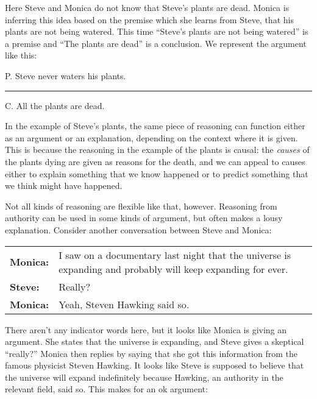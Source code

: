 Here Steve and Monica do not know that Steve's plants are dead. Monica is inferring this idea based on the premise which she learns from Steve, that his plants are not being watered. This time ``Steve's plants are not being watered'' is a premise and ``The plants are dead'' is a conclusion. We represent the argument like this:

\begin{earg}
\item[P.] Steve never waters his plants. 
\vspace{-.5em}
\item [] \rule{0.3\linewidth}{.5pt} 
\item[C.] All the plants are dead. 
\end{earg}

In the example of Steve's plants, the same piece of reasoning can function either as an argument or an explanation, depending on the context where it is given. This is because the reasoning in the example of the plants is causal: the \textit{causes} of the plants dying are given as reasons for the death, and we can appeal to causes either to explain something that we know happened or to predict something that we think might have happened. 

Not all kinds of reasoning are flexible like that, however. Reasoning from authority can be used in some kinds of argument, but often makes a lousy explanation. Consider another conversation between Steve and Monica:

\begin{adjustwidth}{2em}{0em}
\begin{longtabu}{p{.1\linewidth}p{.8\linewidth}}
\textbf{Monica:} & I saw on a documentary last night that the universe is expanding and probably will keep expanding for ever. \\
\textbf{Steve:} & Really?\\
\textbf{Monica:} &Yeah, Steven Hawking said so. \\
\end{longtabu}
\end{adjustwidth}
\vspace{-1cm}

There aren't any indicator words here, but it looks like Monica is giving an argument. She states that the universe is expanding, and Steve gives a skeptical ``really?'' Monica then replies by saying that she got this information from the famous physicist Steven Hawking. It looks like Steve is supposed to believe that the universe will expand indefinitely because Hawking, an authority in the relevant field, said so. This makes for an ok argument: 

